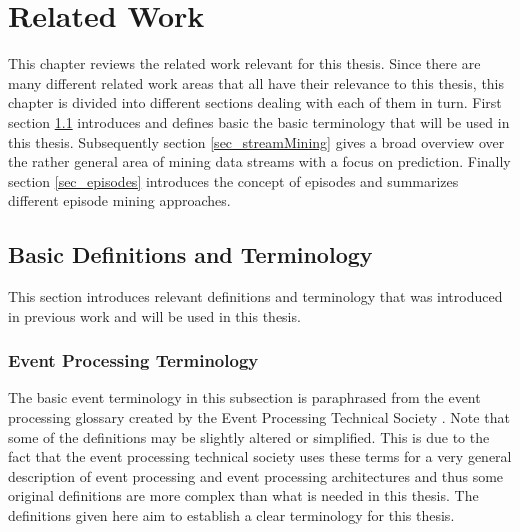 
\chapter{Related Work}
\label{chapter_related}

\ifpdf
    \graphicspath{{Chapter2/Figs/Raster/}{Chapter2/Figs/PDF/}{Chapter2/Figs/}}
\else
    \graphicspath{{Chapter2/Figs/Vector/}{Chapter2/Figs/}}
\fi

This chapter reviews the related work relevant for this thesis. Since there are many different related work areas that all have their relevance to this thesis, this chapter is divided into different sections dealing with each of them in turn. First section \ref{sec_basicDefinitions} introduces and defines basic the basic terminology that will be used in this thesis. Subsequently section \ref{sec_streamMining} gives a broad overview over the rather general area of mining data streams with a focus on prediction. Finally section \ref{sec_episodes} introduces the concept of episodes and summarizes different episode mining approaches.

\section{Basic Definitions and Terminology}
\label{sec_basicDefinitions}
This section introduces relevant definitions and terminology that was introduced in previous work and will be used in this thesis.

\subsection{Event Processing Terminology}
The basic event terminology in this subsection is paraphrased from the event processing glossary created by the Event Processing Technical Society \cite{luckham2011epts}. Note that some of the definitions may be slightly altered or simplified. This is due to the fact that the event processing technical society uses these terms for a very general description of event processing and event processing architectures and thus some original definitions are more complex than what is needed in this thesis. The definitions given here aim to establish a clear terminology for this thesis.


